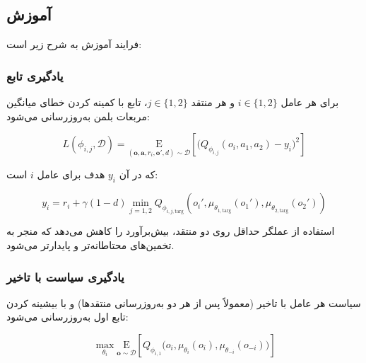 
\subsection{آموزش }

فرایند آموزش  به شرح زیر است:

\subsubsection{یادگیری تابع }

برای هر عامل $i \in \{1, 2\}$ و هر منتقد $j \in \{1, 2\}$، تابع  با کمینه کردن خطای میانگین مربعات بلمن به‌روزرسانی می‌شود:

\begin{equation}
    L(\phi_{i,j}, \mathcal{D}) = \underset{(\boldsymbol{o}, \boldsymbol{a}, r_i, \boldsymbol{o}', d) \sim \mathcal{D}}{\mathrm{E}}\left[ 
    \Bigg( Q_{\phi_{i,j}}(o_i, a_1, a_2) - y_i \Bigg)^2
    \right]
\end{equation}

که در آن $y_i$ هدف برای عامل $i$ است:

\begin{equation}
    y_i = r_i + \gamma (1 - d) \min_{j=1,2} Q_{\phi_{i,j,\text{targ}}}(o_i', \mu_{\theta_{1,\text{targ}}}(o_1'), \mu_{\theta_{2,\text{targ}}}(o_2'))
\end{equation}

استفاده از عملگر حداقل روی دو منتقد، بیش‌برآورد را کاهش می‌دهد که منجر به تخمین‌های محتاطانه‌تر و پایدارتر می‌شود.

\subsubsection{یادگیری سیاست با تاخیر}

سیاست هر عامل با تاخیر (معمولاً پس از هر دو به‌روزرسانی منتقدها) و با بیشینه کردن تابع  اول به‌روزرسانی می‌شود:

\begin{equation}
    \max_{\theta_i} \underset{\boldsymbol{o} \sim \mathcal{D}}{\mathrm{E}}\left[ 
    Q_{\phi_{i,1}}\big(o_i, \mu_{\theta_i}(o_i), \mu_{\theta_{-i}}(o_{-i})\big) 
    \right]
\end{equation}


